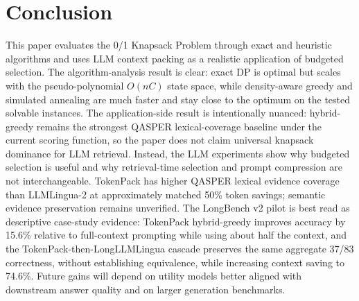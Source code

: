 \documentclass[conference]{IEEEtran}
\begin{document}
\section{Conclusion}
This paper evaluates the 0/1 Knapsack Problem through exact and heuristic algorithms and uses LLM context packing as a realistic application of budgeted selection. The algorithm-analysis result is clear: exact DP is optimal but scales with the pseudo-polynomial $O(nC)$ state space, while density-aware greedy and simulated annealing are much faster and stay close to the optimum on the tested solvable instances. The application-side result is intentionally nuanced: hybrid-greedy remains the strongest QASPER lexical-coverage baseline under the current scoring function, so the paper does not claim universal knapsack dominance for LLM retrieval. Instead, the LLM experiments show why budgeted selection is useful and why retrieval-time selection and prompt compression are not interchangeable. TokenPack has higher QASPER lexical evidence coverage than LLMLingua-2 at approximately matched 50\% token savings; semantic evidence preservation remains unverified. The LongBench v2 pilot is best read as descriptive case-study evidence: TokenPack hybrid-greedy improves accuracy by 15.6\% relative to full-context prompting while using about half the context, and the TokenPack-then-LongLLMLingua cascade preserves the same aggregate 37/83 correctness, without establishing equivalence, while increasing context saving to 74.6\%. Future gains will depend on utility models better aligned with downstream answer quality and on larger generation benchmarks.



\end{document}
